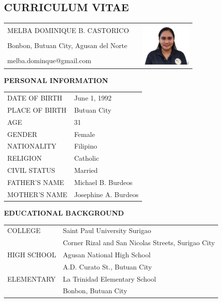 \documentclass[12pt]{report}
\newcommand{\authora}{
    Melba Dominique B. Castorico %
}
\begin{document}
\setlength{\parindent}{0mm}

\begin{spacing}{1.55}

\chapter*{CURRICULUM VITAE}

\begin{tabularx}{\linewidth}{@{}lXr}
    \MakeUppercase{\authora} && \multirow{3}{*}{\includegraphics[width=1in]{img/burdeos}} \\ %
    Bonbon, Butuan City, Agusan del Norte && \\
    melba.dominque@gmail.com && \\
\end{tabularx}

\vspace{20pt}

\textbf{PERSONAL INFORMATION}

\vspace{-10pt}
\hrulefill

\begin{tabular}{@{}l@{ : }l}
    DATE OF BIRTH & June 1, 1992 \\
    PLACE OF BIRTH & Butuan City \\
    AGE & 31 \\
    GENDER & Female \\
    NATIONALITY & Filipino \\
    RELIGION & Catholic \\
    CIVIL STATUS & Married \\
    FATHER'S NAME & Michael B. Burdeos \\
    MOTHER'S NAME & Josephine A. Burdeos \\
\end{tabular}

\vspace{20pt}

\textbf{EDUCATIONAL BACKGROUND}

\vspace{-10pt}
\hrulefill

\begin{tabular}{@{}l@{ : }l}
    COLLEGE & Saint Paul University Surigao \\
    & Corner Rizal and San Nicolas Streets, Surigao City \\
    HIGH SCHOOL & Agusan National High School\\
    & A.D. Curato St., Butuan City \\
    ELEMENTARY & La Trinidad Elementary School \\
    & Bonbon, Butuan City \\
\end{tabular}

\end{spacing}
\end{document}
